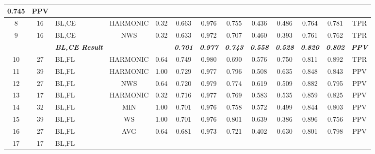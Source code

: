 \begin{table}[H]
{\begin{tabular}{cc|l|cc|c|c|c|c|c|c|c|c|}
    0.745 &
    PPV \\ \hline
  \multicolumn{1}{|c|}{8} &
    16 &
    BL,CE &
    \multicolumn{1}{c|}{HARMONIC} &
    0.32 &
    0.663 &
    0.976 &
    0.755 &
    0.436 &
    0.486 &
    0.764 &
    0.781 &
    TPR \\ \hline
  \multicolumn{1}{|c|}{9} &
    16 &
    BL,CE &
    \multicolumn{1}{c|}{NWS} &
    0.32 &
    0.633 &
    0.972 &
    0.707 &
    0.460 &
    0.393 &
    0.761 &
    0.762 &
    TPR \\ \hline
   &
    \textit{\textbf{}} &
    \textit{\textbf{BL,CE Result}} &
     &
     &
    \textit{\textbf{0.701}} &
    \textit{\textbf{0.977}} &
    \textit{\textbf{0.743}} &
    \textit{\textbf{0.558}} &
    \textit{\textbf{0.528}} &
    \textit{\textbf{0.820}} &
    \textit{\textbf{0.802}} &
    \textit{\textbf{PPV}} \\ \hline
  \multicolumn{1}{|c|}{10} &
    27 &
    BL,FL &
    \multicolumn{1}{c|}{HARMONIC} &
    0.64 &
    0.749 &
    0.980 &
    0.690 &
    0.576 &
    0.750 &
    0.811 &
    0.892 &
    TPR \\ \hline
  \multicolumn{1}{|c|}{11} &
    39 &
    BL,FL &
    \multicolumn{1}{c|}{HARMONIC} &
    1.00 &
    0.729 &
    0.977 &
    0.796 &
    0.508 &
    0.635 &
    0.848 &
    0.843 &
    PPV \\ \hline
  \multicolumn{1}{|c|}{12} &
    27 &
    BL,FL &
    \multicolumn{1}{c|}{NWS} &
    0.64 &
    0.720 &
    0.979 &
    0.774 &
    0.619 &
    0.509 &
    0.882 &
    0.795 &
    PPV \\ \hline
  \multicolumn{1}{|c|}{13} &
    17 &
    BL,FL &
    \multicolumn{1}{c|}{HARMONIC} &
    0.32 &
    0.716 &
    0.977 &
    0.769 &
    0.583 &
    0.535 &
    0.859 &
    0.825 &
    PPV \\ \hline
  \multicolumn{1}{|c|}{14} &
    32 &
    BL,FL &
    \multicolumn{1}{c|}{MIN} &
    1.00 &
    0.701 &
    0.976 &
    0.758 &
    0.572 &
    0.499 &
    0.844 &
    0.803 &
    PPV \\ \hline
  \multicolumn{1}{|c|}{15} &
    39 &
    BL,FL &
    \multicolumn{1}{c|}{WS} &
    1.00 &
    0.701 &
    0.976 &
    0.801 &
    0.639 &
    0.386 &
    0.896 &
    0.756 &
    PPV \\ \hline
  \multicolumn{1}{|c|}{16} &
    27 &
    BL,FL &
    \multicolumn{1}{c|}{AVG} &
    0.64 &
    0.681 &
    0.973 &
    0.721 &
    0.402 &
    0.630 &
    0.801 &
    0.798 &
    PPV \\ \hline
  \multicolumn{1}{|c|}{17} &
    17 &
    BL,FL &

\end{tabular}}
\end{table}
